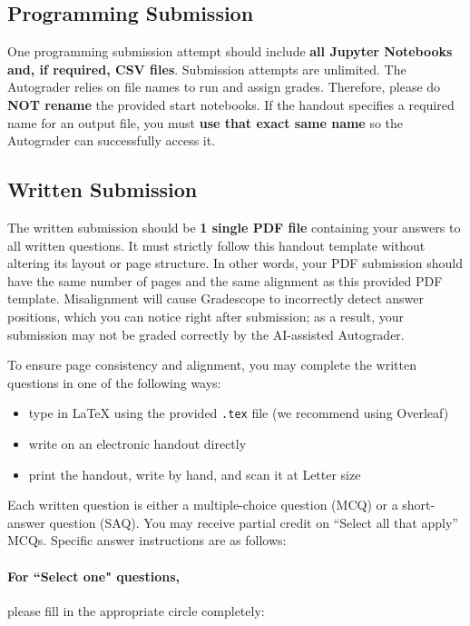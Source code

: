 \documentclass[11pt, letter, answers]{exam}
\begin{document}
\subsection*{Programming Submission}
One programming submission attempt should include \textbf{all Jupyter Notebooks and, if required, CSV files}. Submission attempts are unlimited. The Autograder relies on file names to run and assign grades. Therefore, please do \textbf{NOT rename} the provided start notebooks. If the handout specifies a required name for an output file, you must \textbf{use that exact same name} so the Autograder can successfully access it.

\subsection*{Written Submission}
The written submission should be \textbf{1 single PDF file} containing your answers to all written questions. It must strictly follow this handout template without altering its layout or page structure. In other words, your PDF submission should have the same number of pages and the same alignment as this provided PDF template. Misalignment will cause Gradescope to incorrectly detect answer positions, which you can notice right after submission; as a result, your submission may not be graded correctly by the AI-assisted Autograder. 

To ensure page consistency and alignment, you may complete the written questions in one of the following ways:

\begin{itemize}
    \item type in \LaTeX{} using the provided \texttt{.tex} file (we recommend using Overleaf)
    \item write on an electronic handout directly
    \item print the handout, write by hand, and scan it at Letter size
\end{itemize}

Each written question is either a multiple-choice question (MCQ) or a short-answer question (SAQ). You may receive partial credit on ``Select all that apply'' MCQs. Specific answer instructions are as follows:

\paragraph{For ``Select one" questions,} please fill in the appropriate circle completely:
\end{document}
